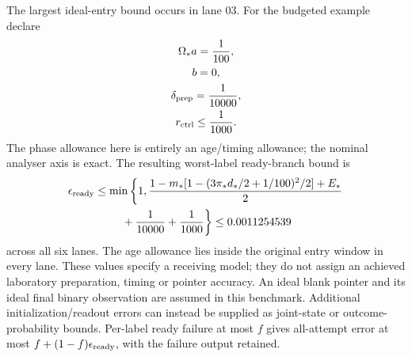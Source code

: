 The largest ideal-entry bound occurs in lane $03$.
For the budgeted example declare
\begin{equation}
\begin{gathered}
\Omega_*a=\frac1{100},\\
 b=0,\\
 \delta_{\rm prep}=\frac1{10000},\\
 r_{\rm ctrl}\leq\frac1{1000}.
\end{gathered}
\label{eq:chvisd-benchmark}
\end{equation}
The phase allowance here is entirely an age/timing allowance;
the nominal analyser axis is exact. The resulting worst-label
ready-branch bound is
\begin{equation}
\begin{gathered}
 \epsilon_{\rm ready}\leq\min\left\{1,
 \frac{1-m_*[1-(3\pi_*d_*/2+1/100)^2/2]+E_*}{2}\right.\\
 \left.{}+\frac1{10000}+\frac1{1000}\right\}
 \leq0.0011254539
\end{gathered}
\label{eq:chvisd-budget-maximum}
\end{equation}
across all six lanes. The age allowance lies inside the original entry
window in every lane. These values specify a receiving model;
they do not assign an achieved laboratory preparation, timing or pointer
accuracy. An ideal blank pointer and its ideal final binary observation
are assumed in this benchmark. Additional initialization/readout errors
can instead be supplied as joint-state or outcome-probability bounds.
Per-label ready failure at most $f$ gives all-attempt error at most
$f+(1-f)\epsilon_{\rm ready}$, with the failure output retained.


